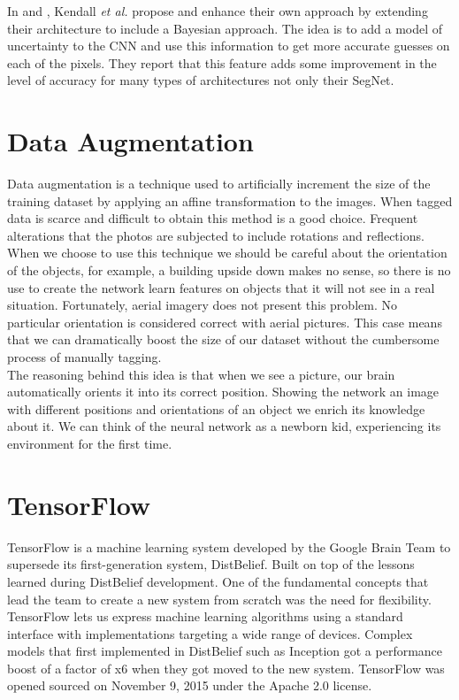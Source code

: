 In \cite{DBLP:journals/corr/KendallBC15} and \cite{DBLP:journals/corr/BadrinarayananK15}, Kendall \textit{et al.} propose and enhance their own approach by extending their architecture to include a Bayesian approach. The idea is to add a model of uncertainty to the CNN and use this information to get more accurate guesses on each of the pixels. They report that this feature adds some improvement in the level of accuracy for many types of architectures not only their SegNet.\\

\section{Data Augmentation}

Data augmentation is a technique used to artificially increment the size of the training dataset by applying an affine transformation to the images. When tagged data is scarce and difficult to obtain this method is a good choice. Frequent alterations that the photos are subjected to include rotations and reflections. When we choose to use this technique we should be careful about the orientation of the objects, for example, a building upside down makes no sense, so there is no use to create the network learn features on objects that it will not see in a real situation. Fortunately, aerial imagery does not present this problem. No particular orientation is considered correct with aerial pictures. This case means that we can dramatically boost the size of our dataset without the cumbersome process of manually tagging.\\

The reasoning behind this idea is that when we see a picture, our brain automatically orients it into its correct position. Showing the network an image with different positions and orientations of an object we enrich its knowledge about it. We can think of the neural network as a newborn kid, experiencing its environment for the first time.\\


\section{TensorFlow}

TensorFlow is a machine learning system developed by the Google Brain Team to supersede its first-generation system, DistBelief. Built on top of the lessons learned during DistBelief development. One of the fundamental concepts that lead the team to create a new system from scratch was the need for flexibility. TensorFlow lets us express machine learning algorithms using a standard interface with implementations targeting a wide range of devices. Complex models that first implemented in DistBelief such as Inception got a performance boost of a factor of x6 \cite{tensorflow2015-whitepaper} when they got moved to the new system. TensorFlow was opened sourced on November 9, 2015 under the Apache 2.0 license.\\ 

